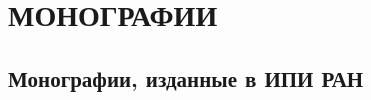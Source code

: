 








      





\vspace*{-28pt} 





\section{МОНОГРАФИИ}





\vspace*{-4pt}


\subsection{Монографии, изданные в ИПИ РАН} %





\noindent


